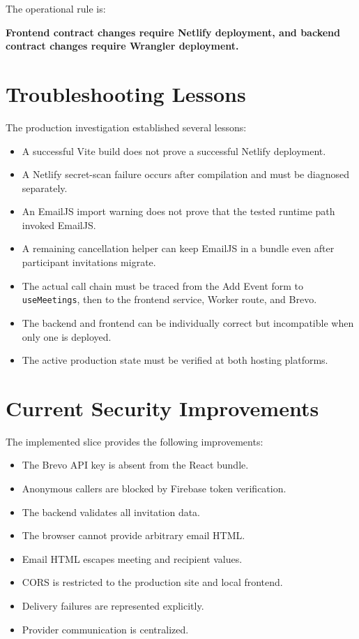 \documentclass[11pt,a4paper,oneside]{report}
\begin{document}
The operational rule is:

\begin{center}
\textbf{Frontend contract changes require Netlify deployment, and backend contract changes require Wrangler deployment.}
\end{center}

\section{Troubleshooting Lessons}

The production investigation established several lessons:

\begin{itemize}
  \item A successful Vite build does not prove a successful Netlify deployment.
  \item A Netlify secret-scan failure occurs after compilation and must be diagnosed separately.
  \item An EmailJS import warning does not prove that the tested runtime path invoked EmailJS.
  \item A remaining cancellation helper can keep EmailJS in a bundle even after participant invitations migrate.
  \item The actual call chain must be traced from the Add Event form to \texttt{useMeetings}, then to the frontend service, Worker route, and Brevo.
  \item The backend and frontend can be individually correct but incompatible when only one is deployed.
  \item The active production state must be verified at both hosting platforms.
\end{itemize}

\section{Current Security Improvements}

The implemented slice provides the following improvements:

\begin{itemize}
  \item The Brevo API key is absent from the React bundle.
  \item Anonymous callers are blocked by Firebase token verification.
  \item The backend validates all invitation data.
  \item The browser cannot provide arbitrary email HTML.
  \item Email HTML escapes meeting and recipient values.
  \item CORS is restricted to the production site and local frontend.
  \item Delivery failures are represented explicitly.
  \item Provider communication is centralized.
\end{itemize}
\end{document}
